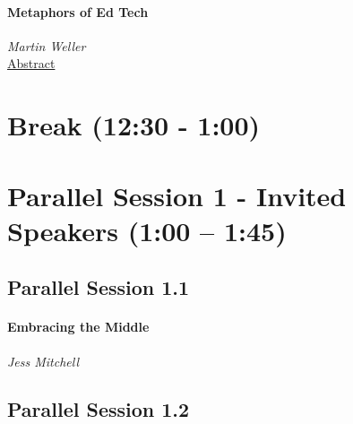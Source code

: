 \documentclass[
]{book}
\begin{document}
\begin{reflect}
\hypertarget{metaphors-of-ed-tech}{%
\paragraph{Metaphors of Ed Tech}\label{metaphors-of-ed-tech}}

\emph{Martin Weller}\\
\href{https://otessa.github.io/2022/keynotes-intro.html\#metaphors-of-edtech}{Abstract}
\end{reflect}

\hypertarget{break-1230---100}{%
\section*{Break (12:30 - 1:00)}\label{break-1230---100}}

\hypertarget{parallel-session-1---invited-speakers-100-145}{%
\section*{Parallel Session 1 - Invited Speakers (1:00 -- 1:45)}\label{parallel-session-1---invited-speakers-100-145}}

\hypertarget{parallel-session-1.1}{%
\subsection*{Parallel Session 1.1}\label{parallel-session-1.1}}

\begin{wp}
\hypertarget{embracing-the-middle}{%
\paragraph{\texorpdfstring{\textbf{Embracing the
Middle}}{Embracing the Middle}}\label{embracing-the-middle}}

\emph{Jess Mitchell}
\end{wp}

\hypertarget{parallel-session-1.2}{%
\subsection*{Parallel Session 1.2}\label{parallel-session-1.2}}
\end{document}
